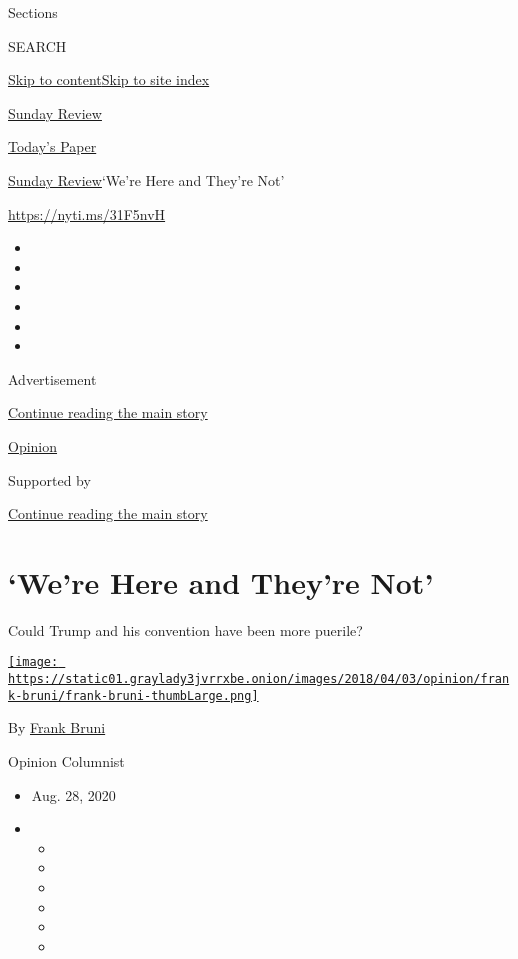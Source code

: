 Sections

SEARCH

\protect\hyperlink{site-content}{Skip to
content}\protect\hyperlink{site-index}{Skip to site index}

\href{https://www.nytimes3xbfgragh.onion/section/opinion/sunday}{Sunday
Review}

\href{https://myaccount.nytimes3xbfgragh.onion/auth/login?response_type=cookie\&client_id=vi}{}

\href{https://www.nytimes3xbfgragh.onion/section/todayspaper}{Today's
Paper}

\href{/section/opinion/sunday}{Sunday Review}\textbar{}`We're Here and
They're Not'

\url{https://nyti.ms/31F5nvH}

\begin{itemize}
\item
\item
\item
\item
\item
\item
\end{itemize}

Advertisement

\protect\hyperlink{after-top}{Continue reading the main story}

\href{/section/opinion}{Opinion}

Supported by

\protect\hyperlink{after-sponsor}{Continue reading the main story}

\hypertarget{were-here-and-theyre-not}{%
\section{`We're Here and They're Not'}\label{were-here-and-theyre-not}}

Could Trump and his convention have been more puerile?

\href{https://www.nytimes3xbfgragh.onion/by/frank-bruni}{\texttt{[image: https://static01.graylady3jvrrxbe.onion/images/2018/04/03/opinion/frank-bruni/frank-bruni-thumbLarge.png]}}

By \href{https://www.nytimes3xbfgragh.onion/by/frank-bruni}{Frank Bruni}

Opinion Columnist

\begin{itemize}
\item
  Aug. 28, 2020
\item
  \begin{itemize}
  \item
  \item
  \item
  \item
  \item
  \item
  \end{itemize}
\end{itemize}

